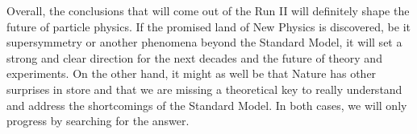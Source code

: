 Overall, the conclusions that will come out of the Run II will definitely shape the future
of particle physics. If the promised land of New Physics is discovered, be it supersymmetry
or another phenomena beyond the Standard Model, it will set a strong and clear direction
for the next decades and the future of theory and experiments. On the other hand, it might
as well be that Nature has other surprises in store and that we are missing a theoretical
key to really understand and address the shortcomings of the Standard Model. In both
cases, we will only progress by searching for the answer.



\emptypage

\emptypage

\renewcommand{\leftmark}{Bibliography}

\begin{thebibliography}{2}

\singlespace



\end{thebibliography}


